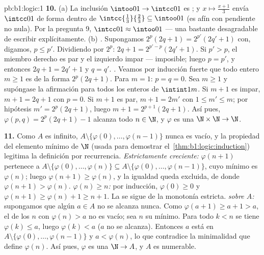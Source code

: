 \begin{solution}{pb:b1:logic:1}
\textbf{10.} (a) La inclusión $\intoo01 \to \intcc01$ es ; y
$x \mapsto \frac{x + 1}3$ envía $\intcc01$ de forma  dentro de
$\intcc{\frac13}{\frac23} \subseteq \intoo01$ (es afín con pendiente no
nula). Por la pregunta 9, $\intcc01 \approx \intoo01$ --- una 
bastante desagradable de escribir explícitamente.
(b) \emph{.} Supongamos $2^p(2q + 1) = 2^{p'}(2q' + 1)$
con, digamos, $p \leq p'$. Dividiendo por $2^p$:
$2q + 1 = 2^{p' - p}(2q' + 1)$. Si $p' > p$, el miembro derecho es par
y el izquierdo impar --- imposible; luego $p = p'$, y entonces
$2q + 1 = 2q' + 1$ y $q = q'$. \emph{.} Veamos por
inducción fuerte que todo entero $m \geq 1$ es de la forma
$2^p(2q + 1)$. Para $m = 1$: $p = q = 0$. Sea $m \geq 1$ y supóngase la
afirmación para todos los enteros de $\intint1m$. Si $m + 1$ es impar,
$m + 1 = 2q + 1$ con $p = 0$. Si $m + 1$ es par, $m + 1 = 2m'$ con
$1 \leq m' \leq m$; por hipótesis $m' = 2^p(2q + 1)$, luego
$m + 1 = 2^{p+1}(2q + 1)$. Así pues, $\varphi(p, q) = 2^p(2q + 1) - 1$
alcanza todo $n \in \N$, y $\varphi$ es una 
$\N \times \N \to \N$.

\textbf{11.} Como $A$ es infinito, $A \setminus \{\varphi(0), \dots,
\varphi(n - 1)\}$ nunca es vacío, y la propiedad del elemento mínimo de
$\N$ (usada para demostrar el~\cref{thm:b1:logic:induction}) legitima la
definición por recurrencia. \emph{Estrictamente creciente:}
$\varphi(n + 1)$ pertenece a $A \setminus \{\varphi(0), \dots,
\varphi(n)\} \subseteq A \setminus \{\varphi(0), \dots, \varphi(n -
1)\}$, cuyo mínimo es $\varphi(n)$; luego $\varphi(n + 1) \geq
\varphi(n)$, y la igualdad queda excluida, de donde $\varphi(n+1) >
\varphi(n)$. \emph{$\varphi(n) \geq n$:} por inducción, $\varphi(0)
\geq 0$ y $\varphi(n + 1) \geq \varphi(n) + 1 \geq n + 1$. La
\emph{} se sigue de la monotonía estricta.
\emph{ sobre $A$:} supongamos que algún $a \in A$ no se
alcanza nunca. Como $\varphi(a + 1) \geq a + 1 > a$, el  de los
$n$ con $\varphi(n) > a$ no es vacío; sea $n$ su mínimo. Para todo
$k < n$ se tiene $\varphi(k) \leq a$, luego $\varphi(k) < a$ ($a$ no se
alcanza). Entonces $a$ está en $A \setminus \{\varphi(0), \dots,
\varphi(n - 1)\}$ y $a < \varphi(n)$, lo que contradice la minimalidad
que define $\varphi(n)$. Así pues, $\varphi$ es una 
$\N \to A$, y $A$ es numerable.


\end{solution}
